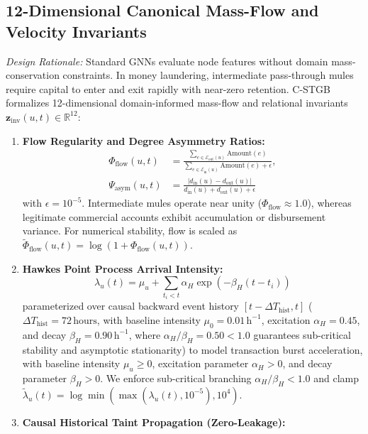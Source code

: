 \subsection{12-Dimensional Canonical Mass-Flow and Velocity Invariants}
\label{sec:canonical_invariants}
\textit{Design Rationale:} Standard GNNs evaluate node features without domain mass-conservation constraints. In money laundering, intermediate pass-through mules require capital to enter and exit rapidly with near-zero retention. C-STGB formalizes 12-dimensional domain-informed mass-flow and relational invariants $\mathbf{z}_{\text{inv}}(u, t) \in \mathbb{R}^{12}$:
\begin{enumerate}
    \item \textbf{Flow Regularity and Degree Asymmetry Ratios:}
    \begin{align}
    \Phi_{\text{flow}}(u, t) &= \frac{\sum_{e \in \mathcal{E}_{\text{out}}(u)} \text{Amount}(e)}{\sum_{e \in \mathcal{E}_{\text{in}}(u)} \text{Amount}(e) + \epsilon}, \\
    \Psi_{\text{asym}}(u, t) &= \frac{|d_{\text{in}}(u) - d_{\text{out}}(u)|}{d_{\text{in}}(u) + d_{\text{out}}(u) + \epsilon}
    \end{align}
    with $\epsilon = 10^{-5}$. Intermediate mules operate near unity ($\Phi_{\text{flow}} \approx 1.0$), whereas legitimate commercial accounts exhibit accumulation or disbursement variance. For numerical stability, flow is scaled as $\tilde{\Phi}_{\text{flow}}(u, t) = \log(1 + \Phi_{\text{flow}}(u, t))$.
    \item \textbf{Hawkes Point Process Arrival Intensity:}
    \begin{equation}
    \lambda_u(t) = \mu_u + \sum_{t_i < t} \alpha_H \exp\left(-\beta_H (t - t_i)\right)
    \end{equation}
    parameterized over causal backward event history $[t - \Delta T_{\text{hist}}, t]$ ($\Delta T_{\text{hist}} = 72\,\text{hours}$, with baseline intensity $\mu_0 = 0.01\,\text{h}^{-1}$, excitation $\alpha_H = 0.45$, and decay $\beta_H = 0.90\,\text{h}^{-1}$, where $\alpha_H / \beta_H = 0.50 < 1.0$ guarantees sub-critical stability and asymptotic stationarity) to model transaction burst acceleration, with baseline intensity $\mu_u \ge 0$, excitation parameter $\alpha_H > 0$, and decay parameter $\beta_H > 0$. We enforce sub-critical branching $\alpha_H / \beta_H < 1.0$ and clamp $\tilde{\lambda}_u(t) = \log \min(\max(\lambda_u(t), 10^{-5}), 10^4)$.
    \item \textbf{Causal Historical Taint Propagation (Zero-Leakage):}

\end{enumerate}
